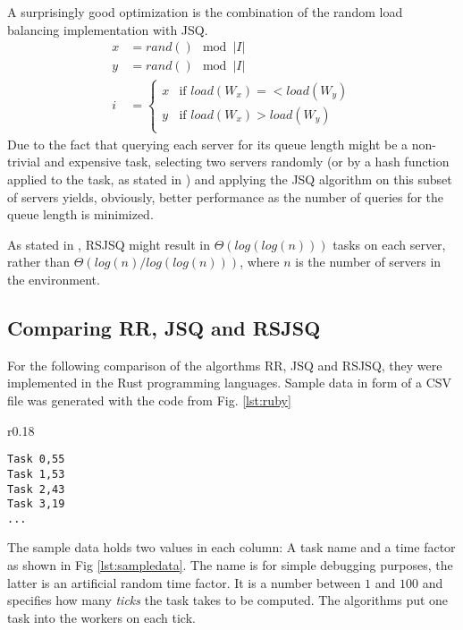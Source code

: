 A surprisingly good optimization is the combination of the random load balancing
implementation with \ac{JSQ}.
\begin{equation}
    \begin{aligned}
		x &= rand() \mod |I| \\
        y &= rand() \mod |I| \\
        i &= \begin{cases}
            x & \text{if } load(W_x) =< load(W_y)\\
            y & \text{if } load(W_x) > load(W_y)\\
        \end{cases}
    \end{aligned}
    \label{eq:randjsq}
\end{equation}
Due to the fact that querying each server for its queue length
might be a non-trivial and expensive task,
selecting two servers randomly (or by a hash function applied to the task, as
stated in \cite{powerOfTwoRandomChoices}) and applying the \ac{JSQ} algorithm on
this subset of servers yields, obviously, better performance as the number of
queries for the queue length is minimized.

As stated in \cite{powerOfTwoRandomChoices}, \ac{RSJSQ} might result in
$\Theta(log(log(n)))$ tasks on each server, rather than
$\Theta(log(n) / log(log(n)))$, where $n$ is the number of servers in the
environment.

\subsection{Comparing RR, \ac{JSQ} and \ac{RSJSQ}}

For the following comparison of the algorthms \ac{RR}, \ac{JSQ} and \ac{RSJSQ},
they were implemented in the Rust programming languages.
Sample data in form of a CSV file was generated with the code from
Fig. \ref{lst:ruby}

\begin{wrapfigure}{r}{0.18\textwidth}
	\begin{verbatim}
Task 0,55
Task 1,53
Task 2,43
Task 3,19
...
	\end{verbatim}
    \caption{Sample data}
    \label{lst:sampledata}
\end{wrapfigure}

The sample data holds two values in each column: A task name and a time factor as shown in
Fig \ref{lst:sampledata}.
The name is for simple debugging purposes, the latter is an artificial random
time factor.
It is a number between $1$ and $100$ and specifies how many \emph{ticks} the
task takes to be computed.
The algorithms put one task into the workers on each tick.


